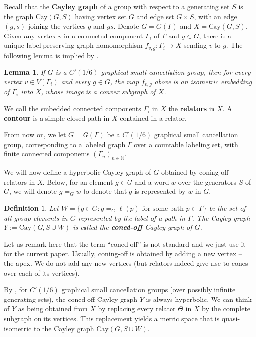 \documentclass{article}[11pt]
\newtheorem{defn}[thm]{Definition}
\newtheorem{lem}[thm]{Lemma}
\newcommand{\N}{\mathbb{N}}
\begin{document}
{Recall that the \textbf{Cayley graph} of a group with respect to a generating set $S$ is the graph $\mathrm{Cay}(G,S)$ having vertex set $G$ and edge set $G \times S$, with an edge $(g,s)$ joining the vertices $g$ and $gs$. Denote $G = G(\Gamma)$ and $X = \mathrm{Cay}(G, S)$. Given any vertex $v$ in a connected component $\Gamma_i$ of $\Gamma$ and $g \in G$, there is a unique label preserving graph homomorphism $f_{v, g}: \Gamma_i \to X$ sending $v$ to $g$. The following lemma is implied by \cite[Lemma 2.15]{Gruber_Sisto}.

\begin{lem}
    If $G$ is a $C'(1/6)$ graphical small cancellation group, then for every vertex $v \in V(\Gamma_i)$ and every $g \in G$, the map $f_{v,g}$ above is an isometric embedding of $\Gamma_i$ into $X$, whose image is a convex subgraph of $X$. 
\end{lem}

We call the embedded connected components $\Gamma_i$ in $X$ the \textbf{relators} in $X$.  A \textbf{contour} is a simple closed path in $X$ contained in a relator.

From now on, we let $G = G(\Gamma)$ be a $C'(1/6)$ graphical small cancellation group, corresponding to a labeled graph $\Gamma$ over a countable labeling set, with finite connected components $(\Gamma_n)_{n \in \N}$.  


We will now define a hyperbolic Cayley graph of $G$ obtained by coning off relators in $X$. Below, for an element $g \in G$ and a word $w$ over the generators $S$ of $G$, we will denote $g =_G w$ to denote that $g$ is represented by $w$ in $G$. 

\begin{defn}
    \label{def:coneCay}
    Let $W = \{g \in G : g =_G \ell(p) \text{ for some path } p \subset \Gamma\}$ be the set of all group elements in $G$ represented by the label of a path in $\Gamma$. The Cayley graph $Y := \mathrm{Cay}(G, S \cup W)$ is called the \textbf{coned-off} Cayley graph of $G$. 
\end{defn}

Let us remark here that the term ``coned-off'' is not standard and we just use it for the current paper. Usually, coning-off is obtained by adding a new vertex -- the apex. We do not add any new vertices (but relators indeed give rise to cones over each of its vertices). 

By \cite[Theorem 3.1]{Gruber_Sisto}, for $C'(1/6)$ graphical small cancellation groups (over possibly infinite generating sets), the coned off Cayley graph $Y$ is always hyperbolic. We can think of $Y$ as being obtained from $X$ by replacing every relator $\Theta$ in $X$ by the complete subgraph on its vertices. This replacement yields a metric space that is quasi-isometric to the Cayley graph $\mathrm{Cay}(G, S \cup W)$.



}
\end{document}
